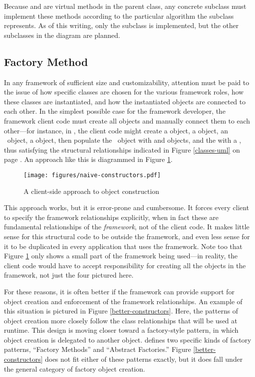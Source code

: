 Because  and  are
virtual methods in the parent class, any concrete subclass must
implement these methods according to the particular algorithm the
subclass represents.  As of this writing, only the
 subclass is implemented, but
the other subclasses in the diagram are planned.


\subsection{Factory Method}
\label{factory-method}

In any framework of sufficient size and customizability, attention
must be paid to the issue of how specific classes are chosen for the
various framework roles, how these classes are instantiated, and how
the instantiated objects are connected to each other.  In the simplest
possible case for the framework developer, the framework client code must create all objects and
manually connect them to each other---for instance, in \aicat, the
client code might create a  object, a
 object, an \aicat\ object, a 
object, then populate the \aicat\ object with  and
 objects, and the  with a
, thus satisfying the structural relationships
indicated in Figure \ref{classes-uml} on page \pageref{classes-uml}.
An approach like this is diagrammed in Figure
\ref{naive-constructors}.

\begin{figure}
\texttt{[image: figures/naive-constructors.pdf]}
\caption{A client-side approach to object construction}
\label{naive-constructors}
\end{figure}

This approach works, but it is error-prone and cumbersome.  It forces
every client to specify the framework relationships explicitly, when
in fact these are fundamental relationships of the \emph{framework},
not of the client code.  It makes little sense for this structural
code to be outside the framework, and even less sense for it to be
duplicated in every application that uses the framework.  Note too
that Figure \ref{naive-constructors} only shows a small part of the
framework being used---in reality, the client code would have to
accept responsibility for creating all the objects in the framework,
not just the four pictured here.

For these reasons, it is often better if the framework can provide
support for object creation and enforcement of the framework
relationships.  An example of this situation is pictured in Figure
\ref{better-constructors}.  Here, the patterns of object creation more
closely follow the class relationships that will be used at runtime.
This design is moving closer toward a factory-style pattern, in which
object creation is delegated to another object. \cite{gamma:95}
defines two specific kinds of factory patterns, ``Factory Methods''
and ``Abstract Factories.''  Figure \ref{better-constructors} does not
fit either of these patterns exactly, but it does fall under the
general category of factory object creation.

